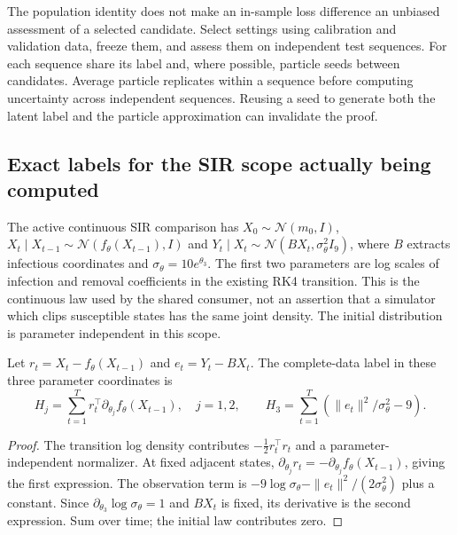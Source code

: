 The population identity does not make an in-sample loss difference an unbiased
assessment of a selected candidate. Select settings using calibration and
validation data, freeze them, and assess them on independent test sequences.
For each sequence share its label and, where possible, particle seeds between
candidates. Average particle replicates within a sequence before computing
uncertainty across independent sequences. Reusing a seed to generate both the
latent label and the particle approximation can invalidate the proof.

\subsection{Exact labels for the SIR scope actually being computed}

The active continuous SIR comparison has
$X_0\sim\mathcal N(m_0,I)$,
$X_t\mid X_{t-1}\sim\mathcal N(f_\theta(X_{t-1}),I)$ and
$Y_t\mid X_t\sim\mathcal N(BX_t,\sigma_\theta^2 I_9)$,
where $B$ extracts infectious coordinates and
$\sigma_\theta=10e^{\theta_3}$. The first two parameters are log scales of
infection and removal coefficients in the existing RK4 transition.
This is the continuous law used by the shared consumer, not an assertion
that a simulator which clips susceptible states has the same joint density.
The initial distribution is parameter independent in this scope.

\begin{proposition}
\label{prop:sg-sir-label}
Let $r_t=X_t-f_\theta(X_{t-1})$ and $e_t=Y_t-BX_t$.
The complete-data label in these three parameter coordinates is
\begin{equation}
 H_j=\sum_{t=1}^T
       r_t^\top\partial_{\theta_j}f_\theta(X_{t-1}),\quad j=1,2,
 \qquad
 H_3=\sum_{t=1}^T(\|e_t\|^2/\sigma_\theta^2-9).
\label{eq:sg-sir-label}
\end{equation}
\end{proposition}
\begin{proof}
The transition log density contributes $-\tfrac12 r_t^\top r_t$ and a
parameter-independent normalizer. At fixed adjacent states,
$\partial_{\theta_j}r_t=-\partial_{\theta_j}f_\theta(X_{t-1})$, giving
the first expression. The observation term is
$-9\log\sigma_\theta-\|e_t\|^2/(2\sigma_\theta^2)$ plus a constant.
Since $\partial_{\theta_3}\log\sigma_\theta=1$ and $BX_t$ is fixed,
its derivative is the second expression. Sum over time; the initial law
contributes zero.
\end{proof}

